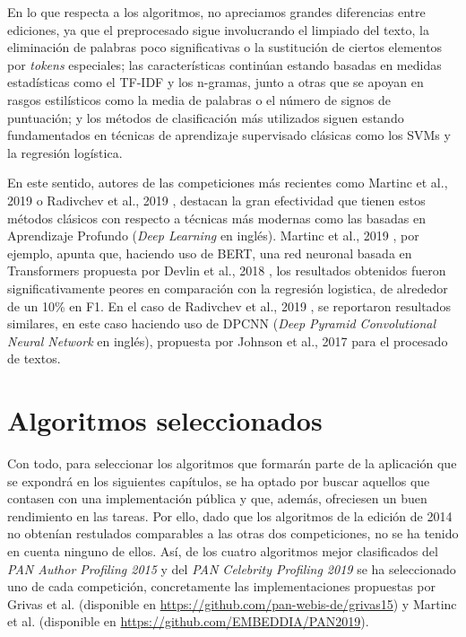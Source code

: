 \bigskip
En lo que respecta a los algoritmos, no apreciamos grandes diferencias entre ediciones, ya que el preprocesado sigue involucrando
el limpiado del texto, la eliminación de palabras poco significativas o la sustitución de ciertos elementos por \textit{tokens} especiales;
las características continúan estando basadas en medidas estadísticas como el TF-IDF y los n-gramas, junto
a otras que se apoyan en rasgos estilísticos como la media de palabras o el número de signos de puntuación; y los métodos de clasificación más utilizados
siguen estando fundamentados en técnicas de aprendizaje supervisado clásicas como los SVMs y la regresión logística.

\bigskip
En este sentido, autores de las competiciones más recientes como Martinc et al., 2019 \cite{martinc2019hot} o Radivchev et al., 2019 \cite{radivchev2019celebrity}, destacan
la gran efectividad que tienen estos métodos clásicos
con respecto a técnicas más modernas como las basadas en Aprendizaje Profundo (\textit{Deep Learning} en inglés). Martinc et al., 2019 \cite{martinc2019hot}, por ejemplo,
apunta que, haciendo uso de BERT, una red neuronal basada en Transformers propuesta por Devlin et al., 2018 \cite{devlin2018bert},
los resultados obtenidos fueron significativamente peores en comparación con la regresión logistica, de alrededor de un 10\% en F1. En el caso
de Radivchev et al., 2019 \cite{radivchev2019celebrity}, se reportaron resultados similares, en este caso haciendo uso de DPCNN (\textit{Deep Pyramid Convolutional Neural Network} en inglés),
propuesta por Johnson et al., 2017 \cite{johnson2017deep} para el procesado de textos.

\section{Algoritmos seleccionados}
\label{sec:algoritmos_seleccionados}

Con todo, para seleccionar los algoritmos que formarán parte de la aplicación que se expondrá en los siguientes capítulos, se ha optado
por buscar aquellos que contasen con una implementación pública y que, además, ofreciesen un buen rendimiento en las tareas.
Por ello, dado que los algoritmos de la edición de 2014 no obtenían restulados comparables a las otras dos competiciones,
no se ha tenido en cuenta ninguno de ellos. Así, de los cuatro algoritmos mejor clasificados del \textit{PAN Author Profiling 2015} y
del \textit{PAN Celebrity Profiling 2019} se ha seleccionado uno de cada competición, concretamente las implementaciones propuestas por
Grivas et al. \cite{grivas2015author} (disponible en \url{https://github.com/pan-webis-de/grivas15})
y Martinc et al. \cite{martinc2019hot} (disponible en \url{https://github.com/EMBEDDIA/PAN2019}).

